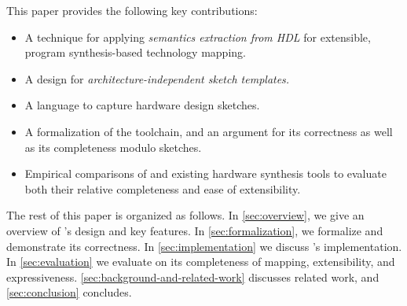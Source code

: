 \vspace{1ex}
\noindent
This paper provides 
the following key contributions:
\begin{itemize}
\item A technique for applying
  \textit{semantics extraction from HDL}
  for extensible,
  program synthesis-based
  technology mapping.
\item A design for
  \textit{architecture-independent
  sketch templates.}
\item A language to capture hardware design sketches.
\item A formalization of the \lr
  toolchain, and an argument
  for its correctness as well as
  its completeness modulo sketches.
\item Empirical comparisons of
  \lr and existing hardware synthesis
  tools to evaluate both their
  relative completeness and
  ease of extensibility.


  



\end{itemize}

The rest of this paper is organized as follows.
In \cref{sec:overview},
  we give an overview
  of \lr's design and key features.
In \cref{sec:formalization},
  we formalize \lr and
  demonstrate its correctness.
In \cref{sec:implementation}
  we discuss \lr's implementation.
In \cref{sec:evaluation}
  we evaluate \lr on its
  completeness of mapping,
  extensibility,
  and expressiveness.
\cref{sec:background-and-related-work}
  discusses related work, and
  \cref{sec:conclusion} concludes.
  





